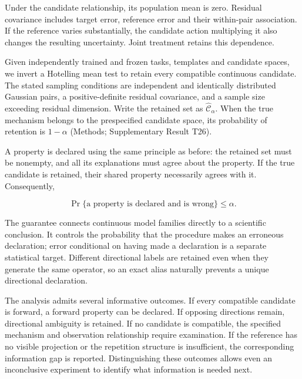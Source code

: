 \documentclass[11pt,a4paper]{article}
\begin{document}
Under the candidate relationship, its population mean is zero. Residual
covariance includes target error, reference error and their within-pair
association. If the reference varies substantially, the candidate action
multiplying it also changes the resulting uncertainty. Joint treatment
retains this dependence.

Given independently trained and frozen tasks, templates and candidate
spaces, we invert a Hotelling mean test to retain every compatible
continuous candidate. The stated sampling conditions are independent and
identically distributed Gaussian pairs, a positive-definite residual
covariance, and a sample size exceeding residual dimension. Write the
retained set as \(\widehat{\mathcal C}_\alpha\). When the true mechanism
belongs to the prespecified candidate space, its probability of
retention is \(1-\alpha\) (Methods; Supplementary Result T26).

\par
\noindent\begin{minipage}{\linewidth}

A property is declared using the same principle as before: the retained
set must be nonempty, and all its explanations must agree about the
property. If the true candidate is retained, their shared property
necessarily agrees with it. Consequently,

\[
\Pr\{\text{a property is declared and is wrong}\}\leq\alpha.
\]

\end{minipage}\par

The guarantee connects continuous model families directly to a
scientific conclusion. It controls the probability that the procedure
makes an erroneous declaration; error conditional on having made a
declaration is a separate statistical target. Different directional
labels are retained even when they generate the same operator, so an
exact alias naturally prevents a unique directional declaration.

The analysis admits several informative outcomes. If every compatible
candidate is forward, a forward property can be declared. If opposing
directions remain, directional ambiguity is retained. If no candidate is
compatible, the specified mechanism and observation relationship require
examination. If the reference has no visible projection or the
repetition structure is insufficient, the corresponding information gap
is reported. Distinguishing these outcomes allows even an inconclusive
experiment to identify what information is needed next.
\end{document}
